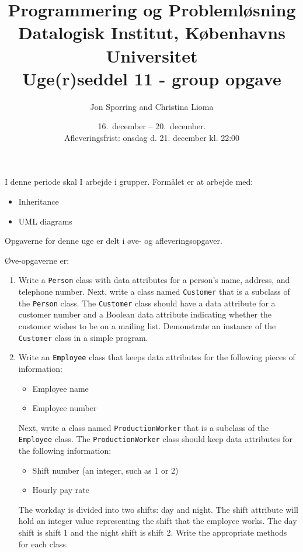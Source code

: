 \documentclass[a4paper,12pt]{article}
\title{Programmering og Problemløsning\\Datalogisk Institut,
  Københavns Universitet\\Uge(r)seddel 11 - group opgave}
\author{Jon Sporring and Christina Lioma}
\date{16.\ december -- 20.\ december.\\Afleveringsfrist: onsdag d. 21. december kl. 22:00}
\begin{document}
\maketitle

I denne periode skal I arbejde i grupper. 
Formålet er at arbejde med:
\begin{itemize}
\item Inheritance
\item UML diagrams
\end{itemize}

Opgaverne for denne uge er delt i øve- og afleveringsopgaver. 

Øve-opgaverne er:
\begin{enumerate}[label=10ø.\arabic*,start=0]

\item Write a \texttt{Person} class with data attributes for a person's name, address, and telephone number. Next, write a class named \texttt{Customer} that is a subclass of the \texttt{Person} class. The \texttt{Customer} class should have a data attribute for a customer number and a Boolean data attribute indicating whether the customer wishes to be on a mailing list. Demonstrate an instance of the \texttt{Customer} class in a simple program.
  
\item Write an \texttt{Employee} class that keeps data attributes for the following pieces of information: 
  \begin{itemize}
  \item Employee name
  \item Employee number
  \end{itemize}
  Next, write a class named \texttt{ProductionWorker} that is a subclass of the \texttt{Employee} class. The \texttt{ProductionWorker} class should keep data attributes for the following information:
  \begin{itemize}
  \item Shift number (an integer, such as 1 or 2)
  \item Hourly pay rate
  \end{itemize}
  The workday is divided into two shifts: day and night. The shift attribute will hold an integer value representing the shift that the employee works. The day shift is shift 1 and the night shift is shift 2. Write the appropriate methods for each class.
  

\end{enumerate}
\end{document}
